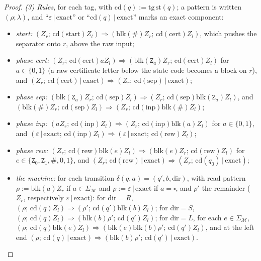 \begin{proof}
\emph{(3) Rules}, for each tag, with $\mathrm{cd}(q):=\mathrm{tg}\,\mathrm{st}(q)$; a pattern is written $(\rho;\lambda)$, and ``$\varepsilon\,|\,\mathrm{exact}$'' or ``$\mathrm{cd}(q)\,|\,\mathrm{exact}$'' marks an exact component:
\begin{itemize}[leftmargin=*]
\item \emph{start:} $(Z_r;\,\mathrm{cd}(\mathrm{start})Z_l)\Rightarrow(\mathrm{blk}(\#)Z_r;\,\mathrm{cd}(\mathrm{cert})Z_l)$, which pushes the separator onto $r$, above the raw input;
\item \emph{phase cert:} $(Z_r;\,\mathrm{cd}(\mathrm{cert})aZ_l)\Rightarrow(\mathrm{blk}(\mathtt Z_a)Z_r;\,\mathrm{cd}(\mathrm{cert})Z_l)$ for $a\in\{0,1\}$ (a raw certificate letter below the state code becomes a block on $r$), and $(Z_r;\,\mathrm{cd}(\mathrm{cert})\,|\,\mathrm{exact})\Rightarrow(Z_r;\,\mathrm{cd}(\mathrm{sep})\,|\,\mathrm{exact})$;
\item \emph{phase sep:} $(\mathrm{blk}(\mathtt Z_a)Z_r;\,\mathrm{cd}(\mathrm{sep})Z_l)\Rightarrow(Z_r;\,\mathrm{cd}(\mathrm{sep})\mathrm{blk}(\mathtt Z_a)Z_l)$, and $(\mathrm{blk}(\#)Z_r;\,\mathrm{cd}(\mathrm{sep})Z_l)\Rightarrow(Z_r;\,\mathrm{cd}(\mathrm{inp})\mathrm{blk}(\#)Z_l)$;
\item \emph{phase inp:} $(aZ_r;\,\mathrm{cd}(\mathrm{inp})Z_l)\Rightarrow(Z_r;\,\mathrm{cd}(\mathrm{inp})\mathrm{blk}(a)Z_l)$ for $a\in\{0,1\}$, and $(\varepsilon\,|\,\mathrm{exact};\,\mathrm{cd}(\mathrm{inp})Z_l)\Rightarrow(\varepsilon\,|\,\mathrm{exact};\,\mathrm{cd}(\mathrm{rew})Z_l)$;
\item \emph{phase rew:} $(Z_r;\,\mathrm{cd}(\mathrm{rew})\mathrm{blk}(e)Z_l)\Rightarrow(\mathrm{blk}(e)Z_r;\,\mathrm{cd}(\mathrm{rew})Z_l)$ for\linebreak[2] $e\in\{\mathtt Z_0,\mathtt Z_1,\#,0,1\}$, and $(Z_r;\,\mathrm{cd}(\mathrm{rew})\,|\,\mathrm{exact})\Rightarrow(Z_r;\,\mathrm{cd}(q_0)\,|\,\mathrm{exact})$;
\item \emph{the machine:} for each transition $\delta(q,a)=(q',b,\mathrm{dir})$, with read pattern $\rho:=\mathrm{blk}(a)Z_r$ if $a\in\Sigma_{\mathcal M}$ and $\rho:=\varepsilon\,|\,\mathrm{exact}$ if $a=\square$, and $\rho'$ the remainder ($Z_r$, respectively $\varepsilon\,|\,\mathrm{exact}$): for $\mathrm{dir}=R$, $(\rho;\,\mathrm{cd}(q)Z_l)\Rightarrow(\rho';\,\mathrm{cd}(q')\mathrm{blk}(b)Z_l)$; for $\mathrm{dir}=S$, $(\rho;\,\mathrm{cd}(q)Z_l)\Rightarrow(\mathrm{blk}(b)\rho';\,\mathrm{cd}(q')Z_l)$; for $\mathrm{dir}=L$, for each $e\in\Sigma_{\mathcal M}$, $(\rho;\,\mathrm{cd}(q)\mathrm{blk}(e)Z_l)\Rightarrow(\mathrm{blk}(e)\mathrm{blk}(b)\rho';\,\mathrm{cd}(q')Z_l)$, and at the left end $(\rho;\,\mathrm{cd}(q)\,|\,\mathrm{exact})\Rightarrow(\mathrm{blk}(b)\rho';\,\mathrm{cd}(q')\,|\,\mathrm{exact})$.
\end{itemize}


\end{proof}
